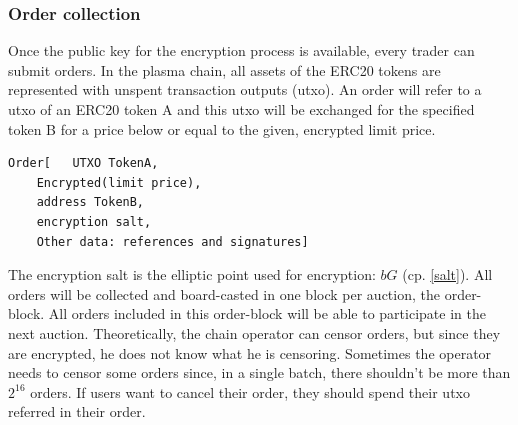 \documentclass[11pt,parskip=full]{scrartcl}%
\begin{document}
\subsubsection{Order collection}
\label{orderblock}
Once the public key for the encryption process is available, every trader can submit orders. In the plasma chain, all assets of the ERC20 tokens are represented with unspent transaction outputs (utxo). An order will refer to a utxo of an ERC20 token A and this utxo will be exchanged for the specified token B for a price below or equal to the given, encrypted limit price.
\begin{lstlisting}
Order[   UTXO TokenA,
	Encrypted(limit price),
	address TokenB,
	encryption salt,
	Other data: references and signatures]
\end{lstlisting} 
The encryption salt is the elliptic point used for encryption:  $bG$ (cp. \ref{salt}).
All orders will be collected and board-casted in one block per auction, the order-block. All orders included in this order-block will be able to participate in the next auction. Theoretically, the chain operator can censor orders, but since they are encrypted, he does not know what he is censoring. Sometimes the operator needs to censor some orders since, in a single batch, there shouldn't be more than $2^{16}$ orders. \newline
If users want to cancel their order, they should spend their utxo referred in their order.
\end{document}
